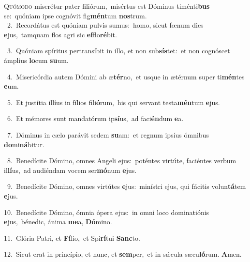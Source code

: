 \lettrine{\initial\textcolor{\initialcolor}{Q}}{uómodo} miserétur pater filiórum,~\dagger misértus est Dóminus timénti\textbf{bus} se:~\star quóniam ipse cognóvit fig\-\textbf{mén}\-tum \textbf{nos}\-trum.\\
{\numbfont\textcolor{\numbcolor}{~2.}}~Recordátus est quóniam pulvis sumus:~\dagger homo, sicut fœnum dies \textbf{e}\-jus,~\star tamquam flos agri sic \textbf{ef}\-flo\-\textbf{ré}\-bit.\par
{\numbfont\textcolor{\numbcolor}{~3.}}~Quóniam spíritus pertransíbit in illo, et non sub\-\textbf{sís}\-tet:~\star et non cognóscet ámplius \textbf{lo}\-cum \textbf{su}\-um.\par
{\numbfont\textcolor{\numbcolor}{~4.}}~Misericórdia autem Dómini ab æ\-\textbf{tér}\-no,~\star et usque in ætérnum super ti\-\textbf{mén}\-tes \textbf{e}\-um.\par
{\numbfont\textcolor{\numbcolor}{~5.}}~Et justítia illíus in fílios fili\-\textbf{ó}\-rum,~\star his qui servant testa\-\textbf{mén}\-tum \textbf{e}\-jus.\par
{\numbfont\textcolor{\numbcolor}{~6.}}~Et mémores sunt mandatórum ip\-\textbf{sí}\-us,~\star ad faci\-\textbf{én}\-dum \textbf{e}\-a.\par
{\numbfont\textcolor{\numbcolor}{~7.}}~Dóminus in cælo parávit sedem \textbf{su}\-am:~\star et regnum ipsíus ómnibus \textbf{do}\-mi\-\textbf{ná}\-bitur.\par
{\numbfont\textcolor{\numbcolor}{~8.}}~Benedícite Dómino, omnes Angeli ejus:~\dagger poténtes virtúte, faciéntes verbum il\-\textbf{lí}\-us,~\star ad audiéndam vocem ser\-\textbf{mó}\-num \textbf{e}\-jus.\par
{\numbfont\textcolor{\numbcolor}{~9.}}~Benedícite Dómino, omnes virtútes \textbf{e}\-jus:~\star minístri ejus, qui fácitis volun\-\textbf{tá}\-tem \textbf{e}\-jus.\par
{\numbfont\textcolor{\numbcolor}{10.}}~Benedícite Dómino, ómnia ópera ejus:~\dagger in omni loco dominatiónis \textbf{e}\-jus,~\star bénedic, ánima \textbf{me}\-a, \textbf{Dó}\-mino.\par
{\numbfont\textcolor{\numbcolor}{11.}}~Glória Patri, et \textbf{Fí}\-lio,~\star et Spi\-\textbf{rí}\-tui \textbf{Sanc}\-to.\par
{\numbfont\textcolor{\numbcolor}{12.}}~Sicut erat in princípio, et nunc, et \textbf{sem}\-per,~\star et in sǽcula sæcu\-\textbf{ló}\-rum. \textbf{A}\-men.\par
